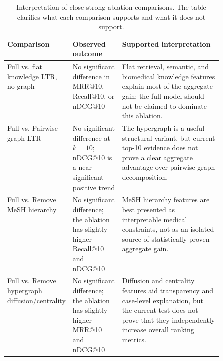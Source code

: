 \begin{table}[t]
\centering
\small
\caption{Interpretation of close strong-ablation comparisons. The table clarifies what each comparison supports and what it does not support.}
\label{tab:strong-ablation-interpretation}
\begin{tabularx}{\linewidth}{p{0.27\linewidth}p{0.23\linewidth}X}
\toprule
Comparison & Observed outcome & Supported interpretation \\
\midrule
Full vs. flat knowledge LTR, no graph & No significant difference in MRR@10, Recall@10, or nDCG@10 & Flat retrieval, semantic, and biomedical knowledge features explain most of the aggregate gain; the full model should not be claimed to dominate this ablation. \\
Full vs. Pairwise graph LTR & No significant difference at $k=10$; nDCG@10 is a near-significant positive trend & The hypergraph is a useful structural variant, but current top-10 evidence does not prove a clear aggregate advantage over pairwise graph decomposition. \\
Full vs. Remove MeSH hierarchy & No significant difference; the ablation has slightly higher Recall@10 and nDCG@10 & MeSH hierarchy features are best presented as interpretable medical constraints, not as an isolated source of statistically proven aggregate gain. \\
Full vs. Remove hypergraph diffusion/centrality & No significant difference; the ablation has slightly higher MRR@10 and nDCG@10 & Diffusion and centrality features aid transparency and case-level explanation, but the current test does not prove that they independently increase overall ranking metrics. \\
\bottomrule
\end{tabularx}
\end{table}
